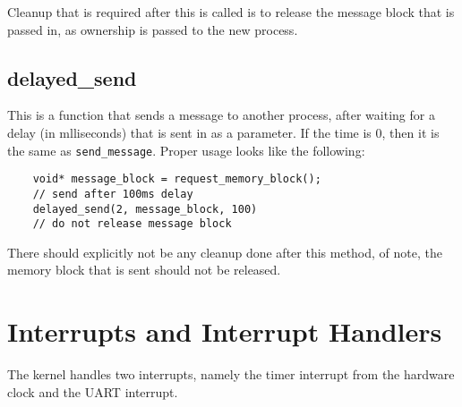 \documentclass[12pt]{article}
\begin{document}
  Cleanup that is required after this is called is to release the message block that is passed in, as ownership is passed to the new process.
\subsection{delayed\_send}\label{delayedsendf}
  This is a function that sends a message to another process, after waiting for a delay (in mlliseconds) that is sent in as a parameter. If the time is 0, then it is the same as \verb|send_message|. Proper usage looks like the following:

  \begin{lstlisting}
    void* message_block = request_memory_block();
    // send after 100ms delay
    delayed_send(2, message_block, 100)
    // do not release message block
  \end{lstlisting}
  There should explicitly not be any cleanup done after this method, of note, the memory block that is sent should not be released.

  \newpage
\section{Interrupts and Interrupt Handlers}\label{interrupts}
The kernel handles two interrupts, namely the timer interrupt from the hardware clock and the UART interrupt.
\end{document}
